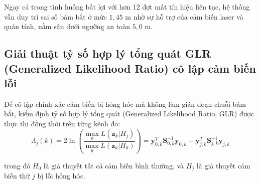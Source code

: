 Ngay cả trong tình huống bất lợi với hơn 12 đợt mất tín hiệu liên tục, hệ thống vẫn duy trì sai số bám bắt ở mức $1{,}45$ m nhờ sự hỗ trợ của cảm biến laser và quán tính, nằm sâu dưới ngưỡng an toàn $5{,}0$ m.

\subsection{Giải thuật tỷ số hợp lý tổng quát GLR (Generalized Likelihood Ratio) cô lập cảm biến lỗi}

\hspace{0.5cm} Để cô lập chính xác cảm biến bị hỏng hóc mà không làm gián đoạn chuỗi bám bắt, kiểm định tỷ số hợp lý tổng quát (Generalized Likelihood Ratio, GLR) được thực thi đồng thời trên từng kênh đo:
\begin{equation}
\Lambda_j(k) = 2 \ln \left( \frac{\max_{\theta} L(\mathbf{z}_k | H_j)}{\max_{\theta} L(\mathbf{z}_k | H_0)} \right) = \mathbf{y}_{0, k}^T \mathbf{S}_{0, k}^{-1} \mathbf{y}_{0, k} - \mathbf{y}_{j, k}^T \mathbf{S}_{j, k}^{-1} \mathbf{y}_{j, k}
\label{eq:glr-test-statistic-formula}
\end{equation}

trong đó $H_0$ là giả thuyết tất cả cảm biến bình thường, và $H_j$ là giả thuyết cảm biến thứ $j$ bị lỗi hỏng hóc.

\begin{table}[H]
\centering
\caption{Độ nhạy và thời gian phát hiện cô lập cảm biến lỗi của giải thuật GLR}
\label{tab:glr-fault-isolation-metrics}
\end{table}

